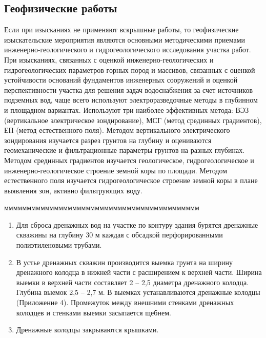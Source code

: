 \documentclass[a4paper,12pt]{article} %
\begin{document}
\subsection{Геофизические работы}
Если при изысканиях не применяют вскрышные работы, то геофизические изыскательские мероприятия являются основными методическими приемами инженерно-геологического и гидрогеологического исследования участка работ.
При изысканиях, связанных с оценкой инженерно-геологических и гидрогеологических параметров горных пород и массивов, связанных с оценкой устойчивости оснований фундаментов инженерных сооружений и оценкой перспективности участка для решения задач водоснабжения за счет источников подземных вод, чаще всего используют электроразведочные методы в глубинном и площадном вариантах.
Используют три наиболее эффективных метода:  ВЭЗ (вертикальное электрическое зондирование), МСГ (метод срединных градиентов), ЕП (метод естественного поля).
Методом вертикального электрического зондирования изучается разрез грунтов на глубину и оцениваются геомеханические и фильтрационные параметры грунтов на разных глубинах.
Методом срединных градиентов изучается геологическое, гидрогеологическое и инженерно-геологическое строение земной коры по площади.
Методом естественного поля изучается гидрогеологическое строение земной коры в плане выявления зон, активно фильтрующих воду.




ммммммммммммммммммммммммммммммммммммммммммм
\begin{enumerate}
\item Для сброса дренажных вод на участке по контуру здания бурятся дренажные скважины на глубину 30 м каждая с обсадкой перфорированными полиэтиленовыми трубами.
\item В устье дренажных скважин производится выемка грунта на ширину дренажного колодца в нижней части  с расширением к верхней части. Ширина выемки в верхней части составляет 2 – 2,5 диаметра дренажного колодца. Глубина выемок 2,5 – 2,7 м. В выемках устанавливаются  дренажные колодцы (Приложение 4). Промежуток между внешними стенками дренажных колодцев и стенками выемки засыпается щебнем.
\item Дренажные колодцы закрываются крышками.

\end{enumerate}
\end{document}
